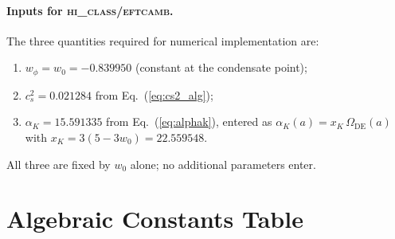 \documentclass[12pt,a4paper]{article}
\newcommand{\Omde}{\Omega_{\mathrm{DE}}}
\begin{document}
\paragraph{Inputs for \textsc{hi\_class}/\textsc{eftcamb}.}
The three quantities required for numerical implementation are:
\begin{enumerate}
  \item $w_\phi = w_0 = -0.839950$ (constant at the condensate point);
  \item $c_s^2 = 0.021284$ from Eq.~(\ref{eq:cs2_alg});
  \item $\alpha_K = 15.591335$ from Eq.~(\ref{eq:alphak}), entered as
    $\alpha_K(a) = x_K\,\Omde(a)$ with $x_K = 3(5-3w_0) = 22.559548$.
\end{enumerate}
All three are fixed by $w_0$ alone; no additional parameters enter.
\section{Algebraic Constants Table}
\label{sec:table}
\end{document}

